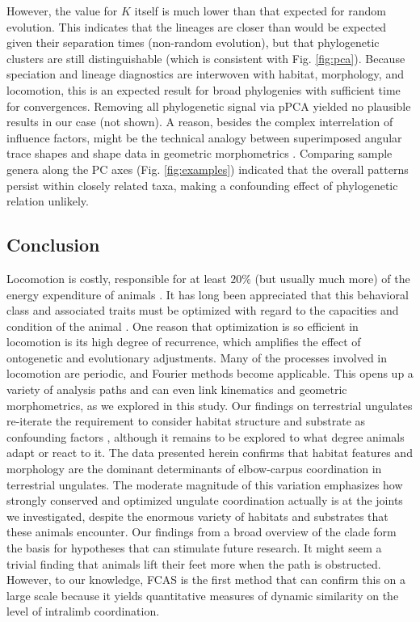 \documentclass[10pt, a4paper]{article}
\begin{document}
However, the value for $K$ itself is much lower than that expected for random evolution. 
This indicates that the lineages are closer than would be expected given their separation times (non-random evolution), but that phylogenetic clusters are still distinguishable (which is consistent with Fig. \ref{fig:pca}). 
Because speciation and lineage diagnostics are interwoven with habitat, morphology, and locomotion, this is an expected result for broad phylogenies with sufficient time for convergences. 
Removing all phylogenetic signal via pPCA \citep{Revell2009} yielded no plausible results in our case (not shown). 
A reason, besides the complex interrelation of influence factors, might be the technical analogy between superimposed angular trace shapes and shape data in geometric morphometrics \citep[\textit{cf.}][]{Polly2013}. 
Comparing sample genera along the PC axes (Fig. \ref{fig:examples}) indicated that the overall patterns persist within closely related taxa, making a confounding effect of phylogenetic relation unlikely. 


\subsection{Conclusion}
Locomotion is costly, responsible for at least $20\%$ (but usually much more) of the energy expenditure of animals \citep{Rezende2009,Girard2001}. 
It has long been appreciated that this behavioral class and associated traits must be optimized with regard to the capacities and condition of the animal \citep{Hoyt1981,Reilly2007}. 
One reason that optimization is so efficient in locomotion is its high degree of recurrence, which amplifies the effect of ontogenetic and evolutionary adjustments. 
Many of the processes involved in locomotion are periodic, and Fourier methods become applicable. 
This opens up a variety of analysis paths and can even link kinematics and geometric morphometrics, as we explored in this study. 
Our findings on terrestrial ungulates re-iterate the requirement to consider habitat structure and substrate as confounding factors \citep[\textit{cf.}][]{Johnson2002,Lejeune1998,Shepard2013}, although it remains to be explored to what degree animals adapt or react to it. 
The data presented herein confirms that habitat features and morphology are the dominant determinants of elbow-carpus coordination in terrestrial ungulates. 
The moderate magnitude of this variation emphasizes how strongly conserved and optimized ungulate coordination actually is at the joints we investigated, despite the enormous variety of habitats and substrates that these animals encounter. 
Our findings from a broad overview of the clade form the basis for hypotheses that can stimulate future research. 
It might seem a trivial finding that animals lift their feet more when the path is obstructed. 
However, to our knowledge, FCAS is the first method that can confirm this on a large scale because it yields quantitative measures of dynamic similarity on the level of intralimb coordination. 
\end{document}
